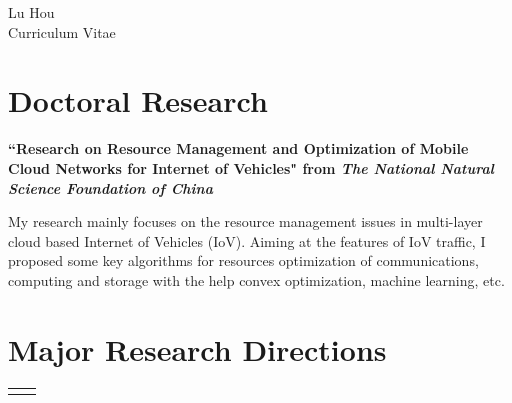 \documentclass[10pt]{article} %
\begin{document}
\begin{paracol}{2} %


\parbox[top][0.12\textheight][c]{\linewidth}{ %
	\vspace{-0.04\textheight} %
	\centering %
	{\Huge Lu Hou}\hspace{1pt} \faMars\\\medskip %
	{\Huge\color{headings}\cvtextfont Curriculum Vitae}
}


\section{Doctoral Research}

{\raggedright\textbf{``Research on Resource Management and Optimization of Mobile Cloud Networks for Internet of Vehicles" from \textit{The National Natural Science Foundation of China}}\\\medskip}

My research mainly focuses on the resource management issues in multi-layer cloud based Internet of Vehicles (IoV). Aiming at the features of IoV traffic, I proposed some key algorithms for resources optimization of communications, computing and storage with the help convex optimization, machine learning, etc.

\medskip %

\section{Major Research Directions}
	\begin{supertabular}{rl}
	\end{supertabular}


\end{paracol}
\end{document}
